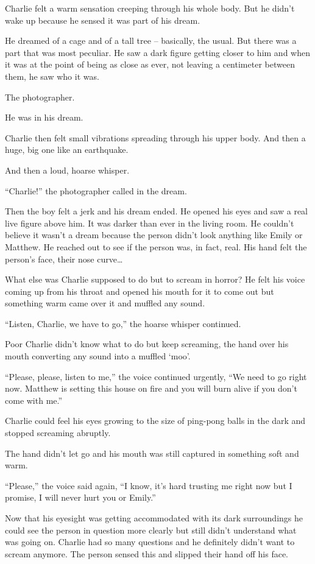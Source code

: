 Charlie felt a warm sensation creeping through his whole body. But he didn't wake up because he sensed it was part of his dream.

He dreamed of a cage and of a tall tree – basically, the usual. But there was a part that was most peculiar. He saw a dark figure getting closer to him and when it was at the point of being as close as ever, not leaving a centimeter between them, he saw who it was.

The photographer.

He was in his dream.

Charlie then felt small vibrations spreading through his upper body. And then a huge, big one like an earthquake.

And then a loud, hoarse whisper.

“Charlie!” the photographer called in the dream.

Then the boy felt a jerk and his dream ended. He opened his eyes and saw a real live figure above him. It was darker than ever in the living room. He couldn't believe it wasn't a dream because the person didn't look anything like Emily or Matthew. He reached out to see if the person was, in fact, real. His hand felt the person's face, their nose curve…

What else was Charlie supposed to do but to scream in horror? He felt his voice coming up from his throat and opened his mouth for it to come out but something warm came over it and muffled any sound.

“Listen, Charlie, we have to go,” the hoarse whisper continued.

Poor Charlie didn't know what to do but keep screaming, the hand over his mouth converting any sound into a muffled ‘moo'.

“Please, please, listen to me,” the voice continued urgently, “We need to go right now. Matthew is setting this house on fire and you will burn alive if you don't come with me.”

Charlie could feel his eyes growing to the size of ping-pong balls in the dark and stopped screaming abruptly.

The hand didn't let go and his mouth was still captured in something soft and warm.

“Please,” the voice said again, “I know, it's hard trusting me right now but I promise, I will never hurt you or Emily.”

Now that his eyesight was getting accommodated with its dark surroundings he could see the person in question more clearly but still didn't understand what was going on. Charlie had so many questions and he definitely didn't want to scream anymore. The person sensed this and slipped their hand off his face.


